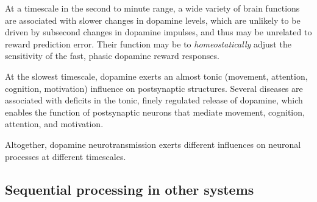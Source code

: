 \documentclass{article}
\numberwithin{equation}{section}
\begin{document}
At a timescale in the second to minute range, a wide variety of brain functions are associated with slower changes in dopamine levels, which are unlikely to be driven by subsecond changes in dopamine impulses, and thus may be unrelated to reward prediction error. Their function may be to \textit{homeostatically} adjust the sensitivity of the fast, phasic dopamine reward responses.

At the slowest timescale, dopamine exerts an almost tonic (movement, attention, cognition, motivation) influence on postsynaptic structures. Several diseases are associated with deficits in the tonic, finely regulated release of dopamine, which enables the function of postsynaptic neurons that mediate movement, cognition, attention, and motivation.

Altogether, dopamine neurotransmission exerts different influences on neuronal processes at different timescales.

\subsection{Sequential processing in other systems}
\end{document}
